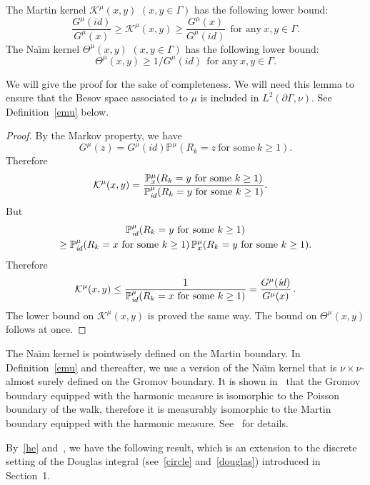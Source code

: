 \documentclass[AHL,Unicode,longabstracts,published]{cedram}
\newcommand{\ck}{\mathcal{K}}
\newcommand{\bp}{\mathbb{P}}
\begin{document}
\begin{lemm}\label{LB-naim}
The Martin kernel $\ck^{\mu}(x,y)$ $(x,y\in\Gamma)$ has the following lower bound:
\[
\frac {G^\mu(id)}{G^\mu(x)}\geq\ck^\mu(x,y)\geq \frac{G^\mu(x)}{G^\mu(\textit{id})}\ \ \text{for\ any}\ x,y\in\Gamma.
\]
The Na{\"\i}m kernel $\Theta^{\mu}(x,y)$ $(x,y\in\Gamma)$ has the following lower bound:
\[
\Theta^{\mu}(x,y)\geq 1/G^{\mu}(\textit{id})\ \ \text{for\ any}\ x,y\in\Gamma.
\]
\end{lemm}
We will give the proof for the sake of completeness. We will need this lemma to ensure that the Besov space associated to $\mu$ is included in $L^2(\partial\Gamma,\nu)$. See Definition~\ref{emu} below.

\begin{proof}
By the Markov property, we have
\[
G^{\mu}(z)=G^{\mu}(\textit{id})\bp^{\mu}(R_k=z\ \text{for\ some}\ k\geq1).
\]
Therefore
\begin{align*}
& \ck^\mu(x,y)=\frac{ \bp^{\mu}_{x}(R_k={y}\ \text{for\ some}\ k\geq1)} {\bp^{\mu}_{\textit id}(R_k={y}\ \text{for\ some}\ k\geq1)}.
\end{align*}
But
\begin{multline*}
\bp^{\mu}_{\textit id}(R_k={y}\ \text{for\ some}\ k\geq1)\\
\geq \bp^{\mu}_{\textit id}(R_k={x}\ \text{for\ some}\ k\geq1)\, \bp^{\mu}_{x}(R_k={y}\ \text{for\ some}\ k\geq1).
\end{multline*}
Therefore
\[
\ck^\mu(x,y)\leq \frac 1{\bp^{\mu}_{\textit id}(R_k={x}\ \text{for\ some}\ k\geq1)} = \frac{G^\mu({\textit id})}{G^\mu(x)}\,.
\]
The lower bound on $\ck^\mu(x,y)$ is proved the same way. The bound on $ \Theta^{\mu}(x,y)$ follows at once.
\end{proof}

\begin{rema}
The Na{\"\i}m kernel is pointwisely defined on the Martin boundary. In Definition~\ref{emu} and thereafter, we use a version of the Na{\"\i}m
kernel that is $\nu\times\nu$-almost surely defined on the Gromov boundary. It is shown in~\cite{Ka} that the Gromov boundary equipped with the harmonic measure is isomorphic to the Poisson boundary of the walk, therefore it is measurably isomorphic to the Martin boundary equipped with the harmonic measure. See~\cite[Chapter~VI]{Woe} for details.
\end{rema}

By~\eqref{he} and~\cite[Theorem~3,5]{Sil}, we have the following result, which is an extension to the discrete setting of the Douglas integral (see~\eqref{circle} and~\eqref{douglas}) introduced in Section~1.
\end{document}
